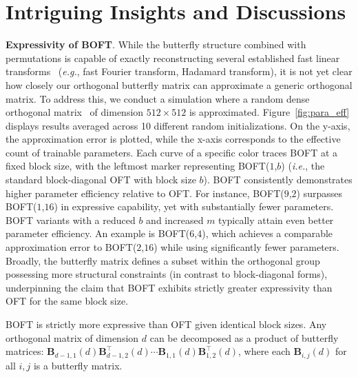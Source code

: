 \section{Intriguing Insights and Discussions}

\textbf{Expressivity of BOFT}. While the butterfly structure combined with permutations is capable of exactly reconstructing several established fast linear transforms~\cite{dao2019learning,dao2019kaleidoscope} (\emph{e.g.}, fast Fourier transform, Hadamard transform), it is not yet clear how closely our orthogonal butterfly matrix can approximate a generic orthogonal matrix. To address this, we conduct a simulation where a random dense orthogonal matrix~\cite{anderson1987generation} of dimension $512\times 512$ is approximated. Figure~\ref{fig:para_eff} displays results averaged across 10 different random initializations. On the y-axis, the approximation error is plotted, while the x-axis corresponds to the effective count of trainable parameters. Each curve of a specific color traces BOFT at a fixed block size, with the leftmost marker representing BOFT($1$,$b$) (\emph{i.e.}, the standard block-diagonal OFT with block size $b$). BOFT consistently demonstrates higher parameter efficiency relative to OFT. For instance, BOFT($9$,$2$) surpasses BOFT($1$,$16$) in expressive capability, yet with substantially fewer parameters. BOFT variants with a reduced $b$ and increased $m$ typically attain even better parameter efficiency. An example is BOFT($6$,$4$), which achieves a comparable approximation error to BOFT($2$,$16$) while using significantly fewer parameters. Broadly, the butterfly matrix defines a subset within the orthogonal group possessing more structural constraints (in contrast to block-diagonal forms), underpinning the claim that BOFT exhibits strictly greater expressivity than OFT for the same block size.

\begin{theorem}\label{thm:exp_boft}
    BOFT is strictly more expressive than OFT given identical block sizes. Any orthogonal matrix of dimension $d$ can be decomposed as a product of butterfly matrices:  $\bm{B}_{d-1,1}(d)\bm{B}^\top_{d-1,2}(d)\cdots\bm{B}_{1,1}(d)\bm{B}^\top_{1,2}(d)$, where each $\bm{B}_{i,j}(d)$ for all $i, j$ is a butterfly matrix.
\end{theorem}

